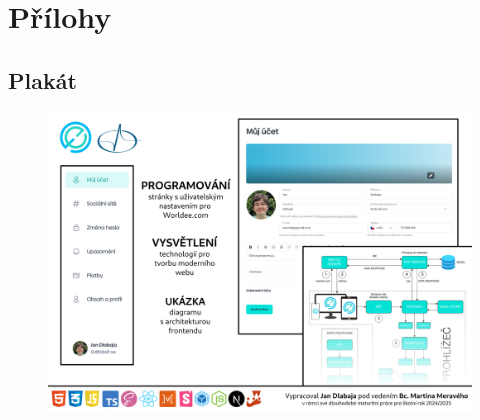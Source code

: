 \appendix

\chapter*{Přílohy}
\renewcommand{\thesection}{\arabic{section}} %

\section{Plakát}
\begin{figure}[!h]
    \centering
    \includegraphics[width=1.2\linewidth, angle=90]{obrazky/plakat.png}
    \label{fig:plakat}
\end{figure}